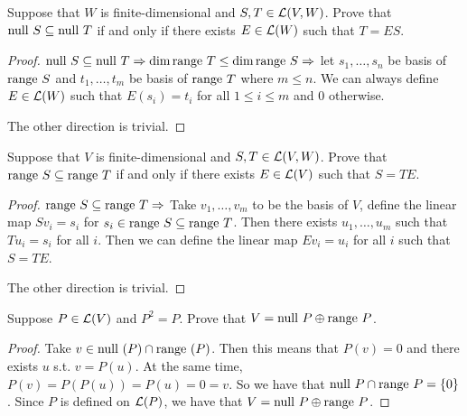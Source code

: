 \documentclass{extarticle}
\begin{document}
\begin{problem}{25}
    Suppose that \(W\) is finite-dimensional and \(S, T \in \mathcal{L}(V, W)\). Prove that 
    \(\text{null } S \subseteq \text{null } T\) if and only if there exists \(E \in \mathcal{L}(W)\)
    such that \(T = ES\).
\end{problem}

\begin{proof}
\(\text{null } S \subseteq \text{null } T \Rightarrow \dim \text{range } T \leq \dim \text{range } S \Rightarrow\)
let \(s_1, \ldots, s_n\) be basis of \(\text{range } S\) and \(t_1, \ldots, t_m\) be basis of \(\text{range } T\)
where \(m \leq n\). We can always define \(E \in \mathcal{L} (W)\) such that \(E(s_i) = t_i\) for all 
\(1 \leq i \leq m\) and 0 otherwise. 

The other direction is trivial. 
\end{proof}

\begin{problem}{26}
    Suppose that \(V\) is finite-dimensional and \(S, T \in \mathcal{L}(V, W)\). Prove that 
    \(\text{range } S \subseteq \text{range } T\) if and only if there exists \(E \in \mathcal{L}(V)\) 
    such that \(S = TE\). 
\end{problem}

\begin{proof}
    \(\text{range } S \subseteq \text{range } T \Rightarrow\) Take \(v_1, \ldots, v_m\) to be the basis 
    of \(V\), define the linear map \(S v_i = s_i\) for \(s_i \in \text{range } S \subseteq \text{range } T\).
    Then there exists \(u_1, \ldots, u_m\) such that \(T u_i = s_i\) for all \(i\). Then we 
    can define the linear map \(E v_i = u_i\) for all \(i\) such that \(S = TE\).  

    The other direction is trivial. 
\end{proof}

\begin{problem}{27}
Suppose \(P \in \mathcal{L}(V)\) and \(P^2 = P\). Prove that \(V = \text{null } P \oplus \text{range } P\).
\end{problem}

\begin{proof}
Take \(v \in \text{null } (P) \cap \text{range } (P)\). Then this means that \(P(v) = 0\) and there exists 
\(u\) s.t. \(v = P(u)\). At the same time, \(P(v) = P(P(u)) = P(u) = 0 =v\). So we have 
that \(\text{null } P \cap \text{range } P = \{0\}\). Since \(P\) is defined on \(\mathcal{L}(P)\), we have that 
\(V = \text{null } P \oplus \text{range } P\). 
\end{proof}

\end{document}
